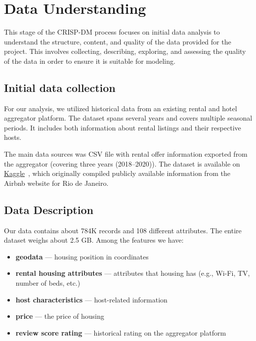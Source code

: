 

\section{Data Understanding}\label{chap:dataUnderstanding}
This stage of the CRISP-DM process focuses on initial data analysis to understand the structure, content, and quality of the data provided for the project. This involves collecting, describing, exploring, and assessing the quality of the data in order to ensure it is suitable for modeling.

\subsection{Initial data collection }\label{sec:initialDataCollection}
For our analysis, we utilized historical data from an existing rental and hotel aggregator platform. The dataset spans several years and covers multiple seasonal periods. It includes both information about rental listings and their respective hosts.

The main data sources was CSV file with rental offer information exported from the aggregator (covering three years (2018--2020)). The dataset is available on \href{https://www.kaggle.com/datasets/hazujaf/airbnb-price-prediction-in-rio-de-janeiro-python?resource=download}{Kaggle}~\cite{airbnb_rio_kaggle}, which originally compiled publicly available information from the Airbnb website for Rio de Janeiro.

\subsection{Data Description }\label{sec:dataDescription}
Our data contains about 784K records and 108 different attributes. The entire dataset weighs about 2.5 GB.
Among the features we have:
\begin{itemize}
    \item \textbf{geodata} --- housing position in coordinates
    \item \textbf{rental housing attributes} --- attributes that housing has (e.g., Wi-Fi, TV, number of beds, etc.)
    \item \textbf{host characteristics} --- host-related information
    \item \textbf{price} --- the price of housing
    \item \textbf{review score rating} --- historical rating on the aggregator platform
\end{itemize}

